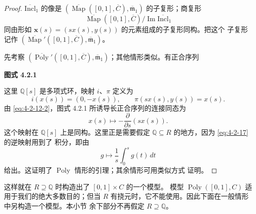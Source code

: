 \begin{proof}
$\overline{\mathrm{Incl}}_1$ 的像是
$(\overline{\operatorname{Map}}([0,1],\overline C),
\overline{\mathfrak m}_1)$ 的子复形；商复形
\[
 \overline{\operatorname{Map}}([0,1],\overline C)
 /\operatorname{Im}\overline{\mathrm{Incl}}_1
\]
同由形如 $\mathbf x(s)=(sx(s),y(s))$ 的元素组成的子复形同构。把这个
子复形记作
$(\overline{\operatorname{Map}}'([0,1],\overline C),
\overline{\mathfrak m}_1)$。

先考察
$(\overline{\operatorname{Poly}}'([0,1],\overline C),
\overline{\mathfrak m}_1)$；其他情形类似。有正合序列
\begin{center}
\par\smallskip\textbf{图式 4.2.1}\label{diag:4-2-1}
\end{center}
这里 $\mathbb Q[s]$ 是多项式环，映射 $i$、$\pi$ 定义为
\[
 i(x(s))=(0,-x(s)),
 \qquad
 \pi(sx(s),y(s))=x(s).
\]
由 \eqref{eq:4-2-12-2}，图式 4.2.1 所诱导长正合序列的连接同态为
\begin{equation}
 x(s)\longmapsto-\frac{\partial}{\partial s}(sx(s)).
\tag{4.2.17}\label{eq:4-2-17}
\end{equation}
这个映射在 $\mathbb Q[s]$ 上是同构。这里正是需要假定
$\mathbb Q\subseteq R$ 的地方，因为 \eqref{eq:4-2-17} 的逆映射用到了
积分，即由
\[
 g\longmapsto\frac1s\int_0^s g(t)\,dt
\]
给出。这证明了 $\operatorname{Poly}$ 情形的引理；其余情形可用类似方式
证明。
\end{proof}

这样就在 $R\supseteq\mathbb Q$ 时构造出了 $[0,1]\times C$ 的一个模型。
模型 $\operatorname{Poly}([0,1],C)$ 适用于我们的绝大多数目的；但当
$R$ 有挠元时，它不能使用。因此下面在一般情形中另构造一个模型。本小节
余下部分不再假定 $R\supseteq\mathbb Q$。

